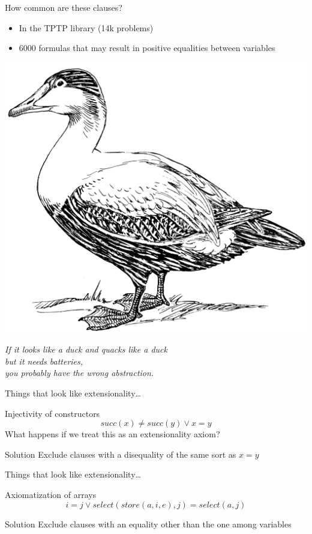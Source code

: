 \begin{frame}
  \begin{block}{How common are these clauses?}
    \begin{itemize}
    \item In the TPTP library (14k problems)
    \item 6000 formulas that may result in positive equalities between
      variables
    \end{itemize}
  \end{block}
\end{frame}

\begin{frame}
  \begin{center}
    \includegraphics[width=.25\textwidth]{duck}
    
    \textit{If it looks like a duck and quacks like a duck\\ but it needs
    batteries,\\you probably have the wrong abstraction.}
  \end{center}
\end{frame}

\begin{frame}{Things that look like extensionality\dots}
  \begin{block}{Injectivity of constructors}
    \[
    succ(x) \neq succ(y) \lor x = y
    \]
    What happens if we treat this as an extensionality axiom?
  \end{block}
  
  \begin{block}{Solution}
    Exclude clauses with a disequality of the same sort as $x = y$
  \end{block}
\end{frame}

\begin{frame}{Things that look like extensionality\dots}
  \begin{block}{Axiomatization of arrays}
    \[
    i = j \lor select(store(a,i,e), j) = select(a, j)
    \]
  \end{block}

  \begin{block}{Solution}
    Exclude clauses with an equality other than the one among
    variables
  \end{block}
\end{frame}

